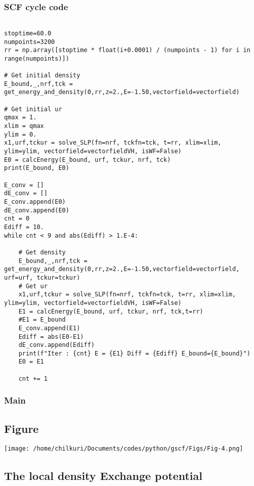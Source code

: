\documentclass[11pt,a4paper]{article}
\begin{document}
\subsubsection{SCF cycle code}
\label{sec:org9f3270c}
\begin{verbatim}

stoptime=60.0
numpoints=3200
rr = np.array([stoptime * float(i+0.0001) / (numpoints - 1) for i in range(numpoints)])

# Get initial density
E_bound,_,nrf,tck = get_energy_and_density(0,rr,z=2.,E=-1.50,vectorfield=vectorfield)

# Get initial ur
qmax = 1.
xlim = qmax
ylim = 0.
x1,urf,tckur = solve_SLP(fn=nrf, tckfn=tck, t=rr, xlim=xlim, ylim=ylim, vectorfield=vectorfieldVH, isWF=False)
E0 = calcEnergy(E_bound, urf, tckur, nrf, tck)
print(E_bound, E0)

E_conv = []
dE_conv = []
E_conv.append(E0)
dE_conv.append(E0)
cnt = 0
Ediff = 10.
while cnt < 9 and abs(Ediff) > 1.E-4:

    # Get density
    E_bound,_,nrf,tck = get_energy_and_density(0,rr,z=2.,E=-1.50,vectorfield=vectorfield, urf=urf, tckur=tckur)
    # Get ur
    x1,urf,tckur = solve_SLP(fn=nrf, tckfn=tck, t=rr, xlim=xlim, ylim=ylim, vectorfield=vectorfieldVH, isWF=False)
    E1 = calcEnergy(E_bound, urf, tckur, nrf, tck,t=rr)
    #E1 = E_bound
    E_conv.append(E1)
    Ediff = abs(E0-E1)
    dE_conv.append(Ediff)
    print(f"Iter : {cnt} E = {E1} Diff = {Ediff} E_bound={E_bound}")
    E0 = E1

    cnt += 1
\end{verbatim}
\subsubsection{Main}
\label{sec:org05b6a3d}

\subsection{Figure}
\label{sec:org4aa9fe3}
\begin{center}
\texttt{[image: /home/chilkuri/Documents/codes/python/gscf/Figs/Fig-4.png]}
\end{center}

\subsection{The local density Exchange potential}
\label{sec:org9d23a8d}
\end{document}
